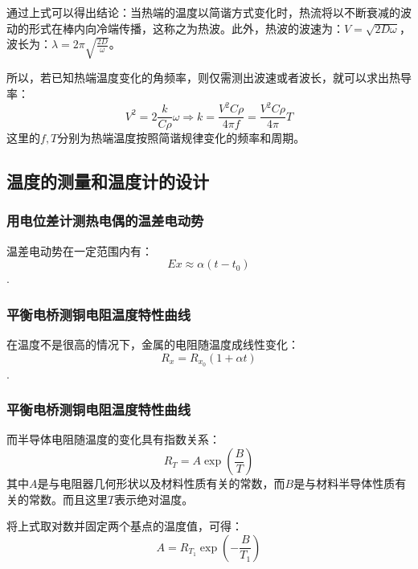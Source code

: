 \documentclass[11pt]{article}
\begin{document}
通过上式可以得出结论：当热端的温度以简谐方式变化时，热流将以不断衰减的波动的形式在棒内向冷端传播，这称之为热波。此外，热波的波速为：$\displaystyle V=\sqrt{2D\omega}$，波长为：$\displaystyle \lambda=2\pi\sqrt{\frac{2D}{\omega}}$。

所以，若已知热端温度变化的角频率，则仅需测出波速或者波长，就可以求出热导率：\begin{displaymath}V^2=2\frac{k}{C\rho}\omega\Rightarrow k=\frac{V^2C\rho}{4\pi f}=\frac{V^2C\rho}{4\pi}T\end{displaymath}这里的$f,T$分别为热端温度按照简谐规律变化的频率和周期。


\subsection{温度的测量和温度计的设计}


\subsubsection{用电位差计测热电偶的温差电动势}

温差电动势在一定范围内有：\begin{displaymath}Ex\approx\alpha(t-t_0)\end{displaymath}.

\subsubsection{平衡电桥测铜电阻温度特性曲线}

在温度不是很高的情况下，金属的电阻随温度成线性变化：\begin{displaymath}R_x=R_{x_0}(1+\alpha t)\end{displaymath}.

\subsubsection{平衡电桥测铜电阻温度特性曲线}

而半导体电阻随温度的变化具有指数关系：\begin{displaymath}R_T=A\exp \left(\frac{B}{T}\right)\end{displaymath}其中$A$是与电阻器几何形状以及材料性质有关的常数，而$B$是与材料半导体性质有关的常数。而且这里$T$表示绝对温度。

将上式取对数并固定两个基点的温度值，可得：\begin{displaymath}A=R_{T_1}\exp \left(-\frac{B}{T_1}\right)\end{displaymath}
\end{document}
